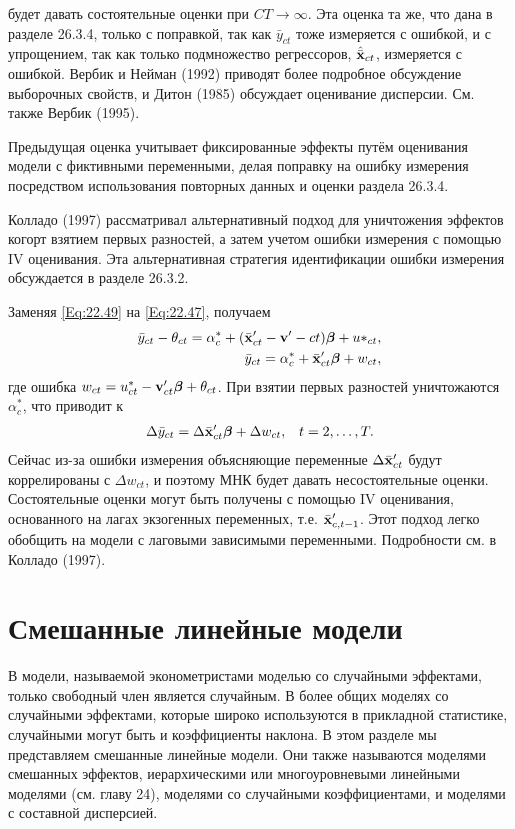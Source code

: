 будет давать состоятельные оценки при $CT \rightarrow \infty$. Эта оценка та же, что дана в разделе 26.3.4, только с поправкой, так как $\bar{y}_{ct}$ тоже измеряется с ошибкой, и с упрощением, так как только подмножество регрессоров, $\hat{\bar{\mathbf{x}}}_{ct}$, измеряется с ошибкой. Вербик и Нейман (1992) приводят более подробное обсуждение выборочных свойств, и Дитон (1985) обсуждает оценивание дисперсии. См. также Вербик (1995).

Предыдущая оценка учитывает фиксированные эффекты путём оценивания модели с фиктивными переменными, делая поправку на ошибку измерения посредством использования повторных данных и оценки раздела 26.3.4.

Колладо (1997) рассматривал альтернативный подход для уничтожения эффектов когорт взятием первых разностей, а затем учетом ошибки измерения с помощью IV оценивания. Эта альтернативная стратегия идентификации ошибки измерения обсуждается в разделе 26.3.2.

Заменяя \ref{Eq:22.49} на \ref{Eq:22.47}, получаем 
 \begin{align}
\bar{y}_{ct}-\theta_{ct}=\alpha^*_c+(\bar{\mathbf{x}}'_{ct}-\mathbf v'-{ct}) \bm{\beta}+u*_{ct}, \nonumber \\
\bar{y}_{ct}=\alpha^*_c+\bar{\mathbf{x}}'_{ct}\bm{\beta}+w_{ct}
\nonumber,
\end{align}
где ошибка $w_{ct}=u^*_{ct}-\mathbf v'_{ct}\bm{\beta}+\theta_{ct}$. При взятии первых разностей уничтожаются $\alpha^*_c$, что приводит к 
 \begin{align}
& \Delta \bar{y}_{ct}=\Delta \bar{\mathbf{x}}'_{ct}\bm{\beta}+\Delta w_{ct},
&t=2, \dots, T.
\label{Eq:22.51}
\end{align}
Сейчас из-за ошибки измерения объясняющие переменные $\Delta \bar{\mathbf{x}}'_{ct}$ будут коррелированы с $\Delta w_{ct}$, и поэтому МНК будет давать несостоятельные оценки. Состоятельные оценки могут быть получены с помощью IV оценивания, основанного на лагах экзогенных переменных, т.е. $\bar{\mathbf{x}}'_{c,t-1}$. Этот подход легко обобщить на модели с  лаговыми зависимыми переменными. Подробности см. в Колладо (1997).

\section{Смешанные линейные модели}

В модели, называемой эконометристами моделью со случайными эффектами, только свободный член является случайным. В более общих моделях со случайными эффектами, которые широко используются в прикладной статистике, случайными могут быть и коэффициенты наклона. В этом разделе мы представляем смешанные линейные модели. Они также называются моделями смешанных эффектов, иерархическими или многоуровневыми линейными моделями (см. главу 24), моделями со случайными коэффициентами, и моделями с составной дисперсией.

